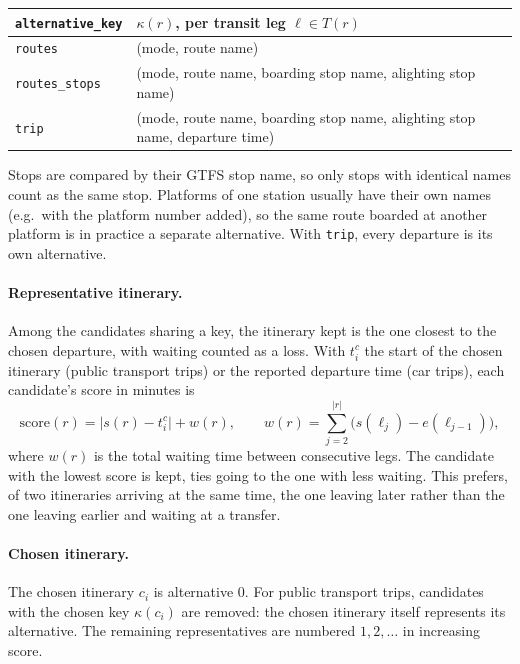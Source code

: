 \documentclass[11pt,a4paper]{article}
\newcommand{\code}[1]{\texttt{#1}}
\newcommand{\key}{\kappa}
\begin{document}
\begin{center}
\begin{tabularx}{\linewidth}{@{}lX@{}}
\toprule
\code{alternative\_key} & $\key(r)$, per transit leg $\ell \in T(r)$ \\
\midrule
\code{routes} & (mode, route name) \\
\code{routes\_stops} & (mode, route name, boarding stop name, alighting stop name) \\
\code{trip} & (mode, route name, boarding stop name, alighting stop name, departure time) \\
\bottomrule
\end{tabularx}
\end{center}

Stops are compared by their GTFS stop name, so only stops with identical names count as the same
stop. Platforms of one station usually have their own names (e.g.\ with the platform number added),
so the same route boarded at another platform is in practice a separate alternative. With
\code{trip}, every departure is its own alternative.

\paragraph{Representative itinerary.} Among the candidates sharing a key, the itinerary kept is the
one closest to the chosen departure, with waiting counted as a loss. With $t^{c}_i$ the start of the
chosen itinerary (public transport trips) or the reported departure time (car trips), each
candidate's score in minutes is
\begin{equation}
  \text{score}(r) = \bigl| s(r) - t^{c}_i \bigr| + w(r),
  \qquad
  w(r) = \sum_{j=2}^{|r|} \bigl( s(\ell_j) - e(\ell_{j-1}) \bigr),
\end{equation}
where $w(r)$ is the total waiting time between consecutive legs. The candidate with the lowest score is
kept, ties going to the one with less waiting. This prefers, of two itineraries arriving at the same
time, the one leaving later rather than the one leaving earlier and waiting at a transfer.

\paragraph{Chosen itinerary.} The chosen itinerary $c_i$ is alternative $0$. For public transport
trips, candidates with the chosen key $\key(c_i)$ are removed: the chosen itinerary itself represents
its alternative. The remaining representatives are numbered $1, 2, \dots$ in increasing score.
\end{document}
